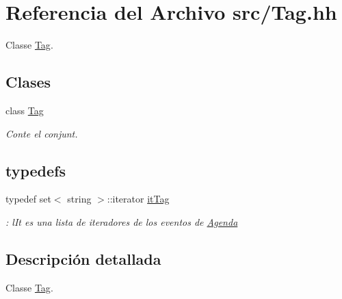 \hypertarget{_tag_8hh}{}\section{Referencia del Archivo src/\+Tag.hh}
\label{_tag_8hh}


Classe \hyperlink{class_tag}{Tag}.  


\subsection*{Clases}
\begin{DoxyCompactItemize}
\item 
class \hyperlink{class_tag}{Tag}
\begin{DoxyCompactList}\small\item\em Conte el conjunt. \end{DoxyCompactList}\end{DoxyCompactItemize}
\subsection*{\textquotesingle{}typedefs\textquotesingle{}}
\begin{DoxyCompactItemize}
\item 
\hypertarget{_tag_8hh_aa1ffaea98934d2496035b29e4bee1786}{}typedef set$<$ string $>$\+::iterator \hyperlink{_tag_8hh_aa1ffaea98934d2496035b29e4bee1786}{it\+Tag}\label{_tag_8hh_aa1ffaea98934d2496035b29e4bee1786}

\begin{DoxyCompactList}\small\item\em \+: l\+It es una lista de iteradores de los eventos de \hyperlink{class_agenda}{Agenda} \end{DoxyCompactList}\end{DoxyCompactItemize}


\subsection{Descripción detallada}
Classe \hyperlink{class_tag}{Tag}. 

